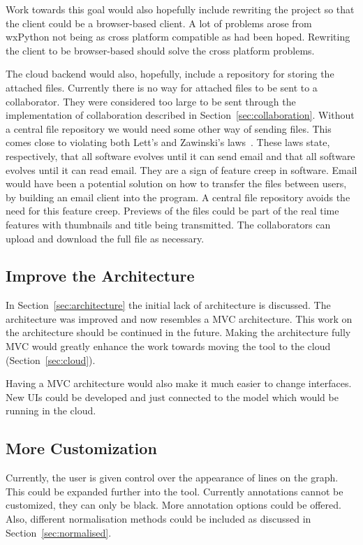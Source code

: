 Work towards this goal would also hopefully include rewriting the project so that the client could be a browser-based client.  A lot of problems arose from wxPython not being as cross platform compatible as had been hoped.  Rewriting the client to be browser-based should solve the cross platform problems.

The cloud backend would also, hopefully, include a repository for storing the attached files.  Currently there is no way for attached files to be sent to a collaborator.  They were considered too large to be sent through the implementation of collaboration described in Section~\ref{sec:collaboration}.  Without a central file repository we would need some other way of sending files.  This comes close to violating both Lett's and Zawinski's laws~\cite{atwood}.  These laws state, respectively, that all software evolves until it can send email and that all software evolves until it can read email.  They are a sign of feature creep in software.  Email would have been a potential solution on how to transfer the files between users, by building an email client into the program.  A central file repository avoids the need for this feature creep.  Previews of the files could be part of the real time features with thumbnails and title being transmitted.  The collaborators can upload and download the full file as necessary.

\subsection{Improve the Architecture}
\label{sec:conc_architect}

In Section~\ref{sec:architecture} the initial lack of architecture is discussed.  The architecture was improved and now resembles a \ac{MVC} architecture.  This work on the architecture should be continued in the future.  Making the architecture fully \ac{MVC} would greatly enhance the work towards moving the tool to the cloud (Section~\ref{sec:cloud}).

Having a \ac{MVC} architecture would also make it much easier to change interfaces.  New \acp{UI} could be developed and just connected to the model which would be running in the cloud.

\subsection{More Customization}
Currently, the user is given control over the appearance of lines on the graph.  This could be expanded further into the tool.  Currently annotations cannot be customized, they can only be black.  More annotation options could be offered.  Also, different normalisation methods could be included as discussed in Section~\ref{sec:normalised}.

